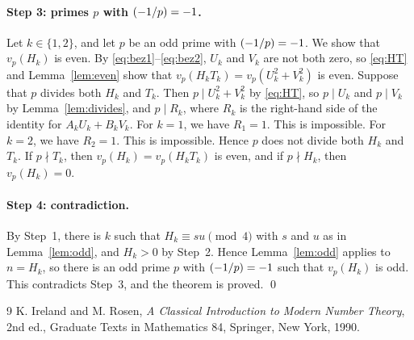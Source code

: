 \documentclass[11pt]{article}
\newcommand{\leg}[2]{\mathchoice{\biggl(\dfrac{#1}{#2}\biggr)}{(#1/#2)}{(#1/#2)}{(#1/#2)}}
\begin{document}
\paragraph{Step 3: primes $p$ with $\leg{-1}{p}=-1$.} Let $k\in\{1,2\}$, and let $p$ be an odd prime with $\leg{-1}{p}=-1$. We show that $v_p(H_k)$ is even. By \eqref{eq:bez1}--\eqref{eq:bez2}, $U_k$ and $V_k$ are not both zero, so \eqref{eq:HT} and Lemma~\ref{lem:even} show that $v_p(H_kT_k)=v_p(U_k^2+V_k^2)$ is even. Suppose that $p$ divides both $H_k$ and $T_k$. Then $p\mid U_k^2+V_k^2$ by \eqref{eq:HT}, so $p\mid U_k$ and $p\mid V_k$ by Lemma~\ref{lem:divides}, and $p\mid R_k$, where $R_k$ is the right-hand side of the identity for $A_kU_k+B_kV_k$. For $k=1$, we have $R_{1}=1$. This is impossible. For $k=2$, we have $R_{2}=1$. This is impossible. Hence $p$ does not divide both $H_k$ and $T_k$. If $p\nmid T_k$, then $v_p(H_k)=v_p(H_kT_k)$ is even, and if $p\nmid H_k$, then $v_p(H_k)=0$.

\paragraph{Step 4: contradiction.} By Step~1, there is $k$ such that $H_k\equiv su\pmod{4}$ with $s$ and $u$ as in Lemma~\ref{lem:odd}, and $H_k>0$ by Step~2. Hence Lemma~\ref{lem:odd} applies to $n=H_k$, so there is an odd prime $p$ with $\leg{-1}{p}=-1$ such that $v_p(H_k)$ is odd. This contradicts Step~3, and the theorem is proved.
\qed

\begin{thebibliography}{9}
 K. Ireland and M. Rosen, \emph{A Classical Introduction to Modern Number Theory}, 2nd ed., Graduate Texts in Mathematics 84, Springer, New York, 1990.
\end{thebibliography}
\end{document}
